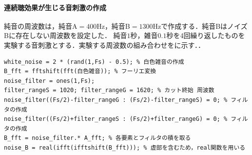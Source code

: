 \paragraph{連続聴効果が生じる音刺激の作成}純音の周波数は，純音A\(=400\textrm{Hz}\)，純音B\(=1300\textrm{Hz}\)で作成する．純音BはノイズBに存在しない周波数を設定した．
純音\(1\)秒，雑音\(0.1\)秒を4回繰り返したものを実験する音刺激とする．実験する周波数の組み合わせをに示す．\scall{}．
\begin{lstlisting}[caption={白色雑音の作成},label={src:白色雑音の作成},numbers={none}]
white_noise = 2 * (rand(1,Fs) - 0.5); % 白色雑音の作成
B_fft = fftshift(fft(白色雑音)); % フーリエ変換
noise_filter = ones(1,Fs);
filter_rangeS = 1020; filter_rangeG = 1620; % カット終始 周波数
noise_filter((Fs/2)-filter_rangeG : (Fs/2)-filter_rangeS) = 0; % フィルタの作成
noise_filter((Fs/2)+filter_rangeS : (Fs/2)+filter_rangeG) = 0; % フィルタの作成
B_fft = noise_filter.* A_fft; % 各要素とフィルタの積を取る
noise_B = real(ifft(ifftshift(B_fft))); % 虚部を含むため，real関数を用いる
\end{lstlisting}
